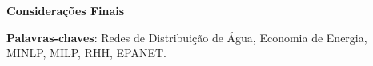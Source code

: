 \begin{resumo}
\noindent\textbf{\large Considerações Finais}\newline

\vspace{\onelineskip}

\noindent\textbf{Palavras-chaves}: Redes de Distribuição de Água, Economia de Energia, MINLP, MILP, RHH, EPANET.
\end{resumo}

